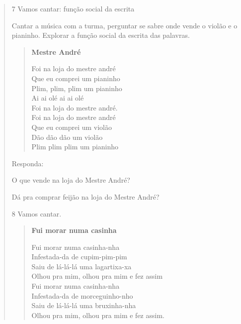 \begin{verse}
\begin{escolha}
\begin{mdframed}[linewidth=2pt,linecolor=salmao,roundcorner=10pt]
\vspace{5cm}
\end{mdframed}
\end{escolha}

\num{7} Vamos cantar: função social da escrita

{Cantar a música com a turma, perguntar se sabre onde vende o violão e o pianinho.
Explorar a função social da escrita das palavras.}

\begin{verse}
\textbf{Mestre André}

Foi na loja do mestre andré\\
Que eu comprei um pianinho\\
Plim, plim, plim um pianinho\\
Ai ai olé ai ai olé\\
Foi na loja do mestre andré.\\
Foi na loja do mestre andré\\
Que eu comprei um violão\\
Dão dão dão um violão\\
Plim plim plim um pianinho
\end{verse}


Responda:

\begin{escolha}
\item O que vende na loja do Mestre André?


\item Dá pra comprar feijão na loja do Mestre André?

\end{escolha}

\num{8} Vamos cantar.

\begin{verse}
\textbf{Fui morar numa casinha}

Fui morar numa casinha-nha\\
Infestada-da de cupim-pim-pim\\
Saiu de lá-lá-lá uma lagartixa-xa\\
Olhou pra mim, olhou pra mim e fez assim\\
Fui morar numa casinha-nha\\
Infestada-da de morceguinho-nho\\
Saiu de lá-lá-lá uma bruxinha-nha\\
Olhou pra mim, olhou pra mim e fez assim.
\end{verse}


\end{verse}
